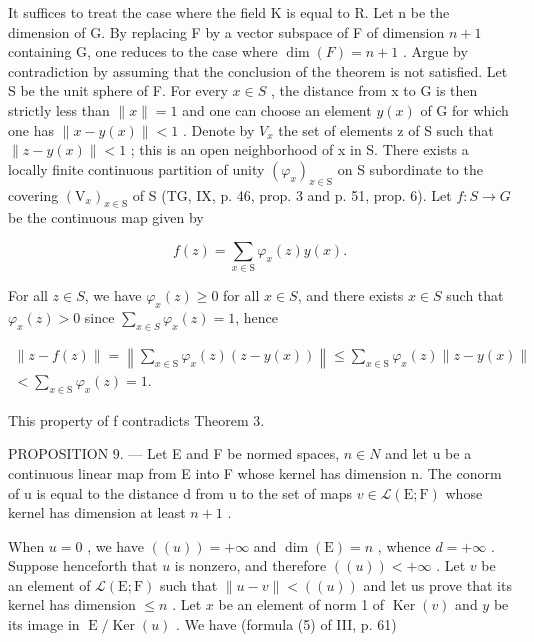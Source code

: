 It suffices to treat the case where the field K is equal to R. Let n be the dimension of G. By replacing F by a vector subspace of F of dimension \(n+1\) containing G, one reduces to the case where \(\dim(F)=n+1\) . Argue by contradiction by assuming that the conclusion of the theorem is not satisfied. Let S be the unit sphere of F. For every \(x\in S\) , the distance from x to G is then strictly less than \(\|x\|=1\) and one can choose an element \(y(x)\) of G for which one has \(\|x-y(x)\|<1\) . Denote by \(V_{x}\) the set of elements z of S such that \(\|z-y(x)\|<1\) ; this is an open neighborhood of x in S. There exists a locally finite continuous partition of unity \((\varphi_{x})_{x\in\mathrm{S}}\) on S subordinate to the covering \((\mathrm{V}_{x})_{x\in\mathrm{S}}\) of S (TG, IX, p. 46, prop. 3 and p. 51, prop. 6). Let \(f\colon S\to G\) be the continuous map given by

\[
f (z) = \sum_ {x \in \mathrm{S}} \varphi_ {x} (z) y (x).
\]

For all \(z \in S\), we have \(\varphi_x(z) \geqslant 0\) for all \(x \in S\), and there exists \(x \in S\) such that \(\varphi_x(z) > 0\) since \(\sum_{x \in S} \varphi_x(z) = 1\), hence

\[
\begin{array}{c} \| z - f (z) \| = \left\| \sum_ {x \in \mathrm{S}} \varphi_ {x} (z) (z - y (x)) \right\| \leqslant \sum_ {x \in \mathrm{S}} \varphi_ {x} (z) \| z - y (x) \| \\ <   \sum_ {x \in \mathrm{S}} \varphi_ {x} (z) = 1. \end{array}
\]

This property of f contradicts Theorem 3.

PROPOSITION 9. — Let E and F be normed spaces, \(n \in N\) and let u be a continuous linear map from E into F whose kernel has dimension n. The conorm of u is equal to the distance d from u to the set of maps \(v \in \mathcal{L}(\mathrm{E};\mathrm{F})\) whose kernel has dimension at least \(n + 1\) .

When \(u = 0\) , we have \(((u)) = +\infty\) and \(\dim(\mathrm{E}) = n\) , whence \(d = +\infty\) . Suppose henceforth that \(u\) is nonzero, and therefore \(((u)) < +\infty\) . Let \(v\) be an element of \(\mathcal{L}(\mathrm{E};\mathrm{F})\) such that \(\| u - v \| < ((u))\) and let us prove that its kernel has dimension \(\leqslant n\) . Let \(x\) be an element of norm 1 of \(\operatorname{Ker}(v)\) and \(y\) be its image in \(\operatorname{E}/\operatorname{Ker}(u)\) . We have (formula (5) of III, p. 61)

